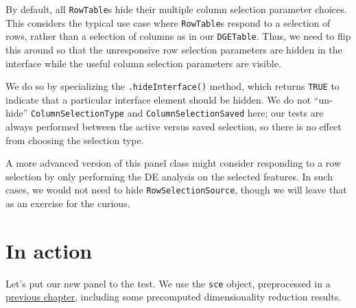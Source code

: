 \documentclass[
]{book}
\newenvironment{Shaded}{\begin{snugshade}}{\end{snugshade}}
\newcommand{\ControlFlowTok}[1]{\textcolor[rgb]{0.13,0.29,0.53}{\textbf{#1}}}
\newcommand{\KeywordTok}[1]{\textcolor[rgb]{0.13,0.29,0.53}{\textbf{#1}}}
\newcommand{\NormalTok}[1]{#1}
\newcommand{\OperatorTok}[1]{\textcolor[rgb]{0.81,0.36,0.00}{\textbf{#1}}}
\newcommand{\OtherTok}[1]{\textcolor[rgb]{0.56,0.35,0.01}{#1}}
\newcommand{\StringTok}[1]{\textcolor[rgb]{0.31,0.60,0.02}{#1}}
\begin{document}
By default, all \texttt{RowTable}s hide their multiple column selection parameter choices.
This considers the typical use case where \texttt{RowTable}s respond to a selection of rows,
rather than a selection of columns as in our \texttt{DGETable}.
Thus, we need to flip this around so that the unresponsive row selection parameters are hidden in the interface
while the useful column selection parameters are visible.

We do so by specializing the \texttt{.hideInterface()} method,
which returns \texttt{TRUE} to indicate that a particular interface element should be hidden.
We do not ``un-hide'' \texttt{ColumnSelectionType} and \texttt{ColumnSelectionSaved} here;
our tests are always performed between the active versus saved selection, so there is no effect from choosing the selection type.

\begin{Shaded}
\end{Shaded}

A more advanced version of this panel class might consider responding to a row selection by only performing the DE analysis on the selected features.
In such cases, we would not need to hide \texttt{RowSelectionSource}, though we will leave that as an exercise for the curious.

\hypertarget{in-action}{%
\section{In action}\label{in-action}}

Let's put our new panel to the test.
We use the \texttt{sce} object, preprocessed in a \protect\hyperlink{developing}{previous chapter}, including some precomputed dimensionality reduction results.
\end{document}

